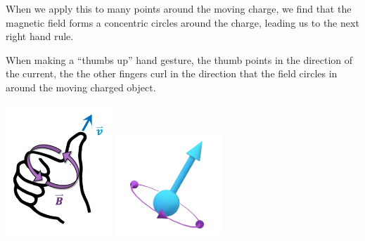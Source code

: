 \documentclass[12pt, titlepage]{article}
\begin{document}
When we apply this to many points around the moving charge, we find that the magnetic field forms a concentric circles around the charge, leading us to the next right hand rule.

When making a ``thumbs up'' hand gesture, the thumb points in the direction of the current, the the other fingers curl in the direction that the field circles in around the moving charged object.
\begin{center}
    \includegraphics[width=4cm]{media/rh2_2.png}
    \includegraphics[width=4cm]{media/rh2.png}
\end{center}
\end{document}
